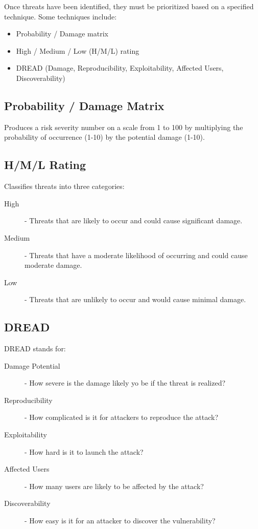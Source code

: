 \documentclass[12pt letter]{report}
\begin{document}
Once threats have been identified, they must be prioritized based on
a specified technique.
Some techniques include:
\begin{itemize}
  \item Probability / Damage matrix
  \item High / Medium / Low (H/M/L) rating
  \item DREAD (Damage, Reproducibility, Exploitability, Affected Users,
    Discoverability)
\end{itemize}

\subsection{Probability / Damage Matrix}

Produces a risk severity number on a scale from 1 to 100 by multiplying
the probability of occurrence (1-10) by the potential damage (1-10).

\subsection{H/M/L Rating}

Classifies threats into three categories:
\begin{description}
  \item[High] - Threats that are likely to occur and could cause
    significant damage.
  \item[Medium] - Threats that have a moderate likelihood of occurring
    and could cause moderate damage.
  \item[Low] - Threats that are unlikely to occur and would cause
    minimal damage.
\end{description}

\subsection{DREAD}

DREAD stands for:
\begin{description}
  \item[Damage Potential]  - How severe is the damage likely yo be if
    the threat is realized?
  \item[Reproducibility] - How complicated is it for attackers to
    reproduce the attack?
  \item[Exploitability] - How hard is it to launch the attack?
  \item[Affected Users] - How many users are likely to be affected by
    the attack?
  \item[Discoverability] - How easy is it for an attacker to discover the
    vulnerability?
\end{description}
\end{document}
